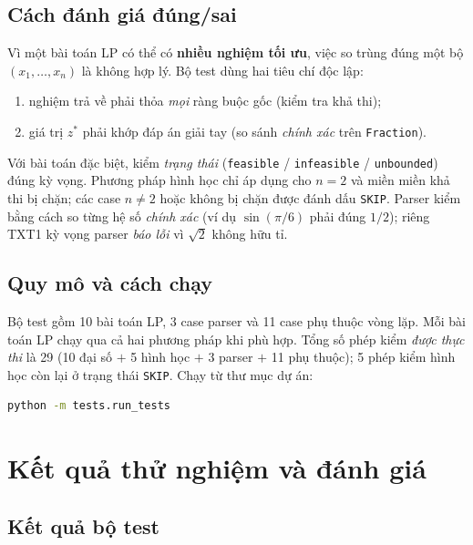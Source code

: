 \documentclass[12pt,a4paper]{article}
\theoremstyle{definition}
\begin{document}
\subsection{Cách đánh giá đúng/sai}

Vì một bài toán LP có thể có \textbf{nhiều nghiệm tối ưu}, việc so trùng đúng
một bộ $(x_1, \ldots, x_n)$ là không hợp lý. Bộ test dùng hai tiêu chí độc lập:
\begin{enumerate}
    \item nghiệm trả về phải thỏa \emph{mọi} ràng buộc gốc (kiểm tra khả thi);
    \item giá trị $z^\ast$ phải khớp đáp án giải tay (so sánh \emph{chính xác}
          trên \texttt{Fraction}).
\end{enumerate}
Với bài toán đặc biệt, kiểm \emph{trạng thái} (\texttt{feasible} /
\texttt{infeasible} / \texttt{unbounded}) đúng kỳ vọng. Phương pháp hình học chỉ
áp dụng cho $n = 2$ và miền miền khả thi bị chặn; các case $n \ne 2$ hoặc không bị chặn
được đánh dấu \texttt{SKIP}. Parser kiểm bằng cách so từng hệ số \emph{chính
xác} (ví dụ $\sin(\pi/6)$ phải đúng $1/2$); riêng TXT1 kỳ vọng parser
\emph{báo lỗi} vì $\sqrt{2}$ không hữu tỉ.

\subsection{Quy mô và cách chạy}

Bộ test gồm 10 bài toán LP, 3 case parser và 11 case phụ thuộc vòng lặp. Mỗi bài
toán LP chạy qua cả hai phương pháp khi phù hợp. Tổng số phép kiểm \emph{được
thực thi} là 29 (10 đại số $+$ 5 hình học $+$ 3 parser $+$ 11 phụ thuộc); 5 phép
kiểm hình học còn lại ở trạng thái \texttt{SKIP}. Chạy từ thư mục dự án:
\begin{lstlisting}[language=bash]
python -m tests.run_tests
\end{lstlisting}

\section{Kết quả thử nghiệm và đánh giá}

\subsection{Kết quả bộ test}
\end{document}
